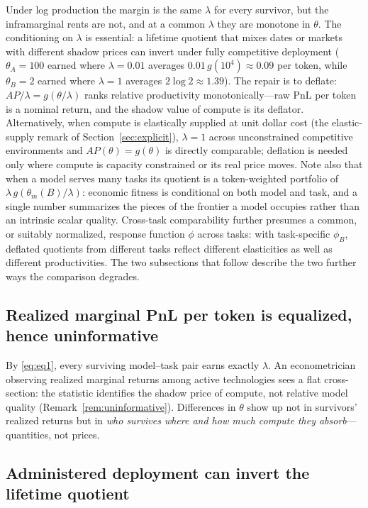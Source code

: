 \documentclass[11pt]{article}
\theoremstyle{definition}
\theoremstyle{remark}
\begin{document}
Under log production the margin is the same $\lambda$ for every survivor, but the inframarginal rents are not, and at a common $\lambda$ they are monotone in $\theta$. The conditioning on $\lambda$ is essential: a lifetime quotient that mixes dates or markets with different shadow prices can invert under fully competitive deployment ($\theta_A = 100$ earned where $\lambda = 0.01$ averages $0.01\,g(10^4) \approx 0.09$ per token, while $\theta_B = 2$ earned where $\lambda = 1$ averages $2\log 2 \approx 1.39$). The repair is to deflate: $AP/\lambda = g(\theta/\lambda)$ ranks relative productivity monotonically---raw PnL per token is a nominal return, and the shadow value of compute is its deflator. Alternatively, when compute is elastically supplied at unit dollar cost (the elastic-supply remark of Section~\ref{sec:explicit}), $\lambda = 1$ across unconstrained competitive environments and $AP(\theta) = g(\theta)$ is directly comparable; deflation is needed only where compute is capacity constrained or its real price moves. Note also that when a model serves many tasks its quotient is a token-weighted portfolio of $\lambda\,g(\theta_m(B)/\lambda)$: economic fitness is conditional on both model and task, and a single number summarizes the pieces of the frontier a model occupies rather than an intrinsic scalar quality. Cross-task comparability further presumes a common, or suitably normalized, response function $\phi$ across tasks: with task-specific $\phi_B$, deflated quotients from different tasks reflect different elasticities as well as different productivities. The two subsections that follow describe the two further ways the comparison degrades.

\subsection{Realized marginal PnL per token is equalized, hence uninformative}

By \eqref{eq:eq1}, every surviving model--task pair earns exactly $\lambda$. An econometrician observing realized marginal returns among active technologies sees a flat cross-section: the statistic identifies the shadow price of compute, not relative model quality (Remark~\ref{rem:uninformative}). Differences in $\theta$ show up not in survivors' realized returns but in \emph{who survives where and how much compute they absorb}---quantities, not prices.

\subsection{Administered deployment can invert the lifetime quotient}
\end{document}
